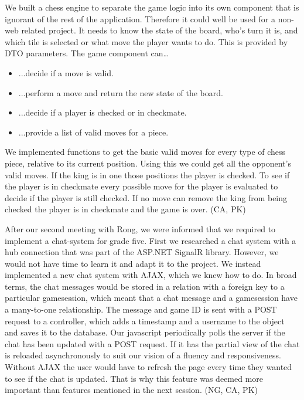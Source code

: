\documentclass[acmlarge, review=false, screen=true]{acmart}
\begin{document}
    We built a chess engine to separate the game logic into its own component that is ignorant of the rest of the application. Therefore it could well be used for a non-web related project. It needs to know the state of the board, who’s turn it is, and which tile is selected or what move the player wants to do. This is provided by DTO parameters. The game component can… 
    \begin{itemize}
      \item ...decide if a move is valid.
      \item ...perform a move and return the new state of the board.
      \item ...decide if a player is checked or in checkmate.
      \item ...provide a list of valid moves for a piece.
    \end{itemize}
    
    We implemented functions to get the basic valid moves for every type of chess piece, relative to its current position. Using this we could get all the opponent’s valid moves. If the king is in one those positions the player is checked. To see if the player is in checkmate every possible move for the player is evaluated to decide if the player is still checked. If no move can remove the king from being checked the player is in checkmate and the game is over. (CA, PK)
    
    After our second meeting with Rong, we were informed that we required to implement a chat-system for grade five. First we researched a chat system with a hub connection that was part of the ASP.NET SignalR library\cite{signalr}. However, we would not have time to learn it and adapt it to the project. We instead implemented a new chat system with AJAX, which we knew how to do. In broad terms, the chat messages would be stored in a relation with a foreign key to a particular gamesession, which meant that a chat message and a gamesession have a many-to-one relationship. The message and game ID is sent with a POST request to a controller, which adds a timestamp and a username to the object and saves it to the database. Our javascript periodically polls the server if the chat has been updated with a POST request. If it has the partial view of the chat is reloaded asynchronously to suit our vision of a fluency and responsiveness. Without AJAX the user would have to refresh the page every time they wanted to see if the chat is updated. That is why this feature was deemed more important than features mentioned in the next session. (NG, CA, PK)
\end{document}
